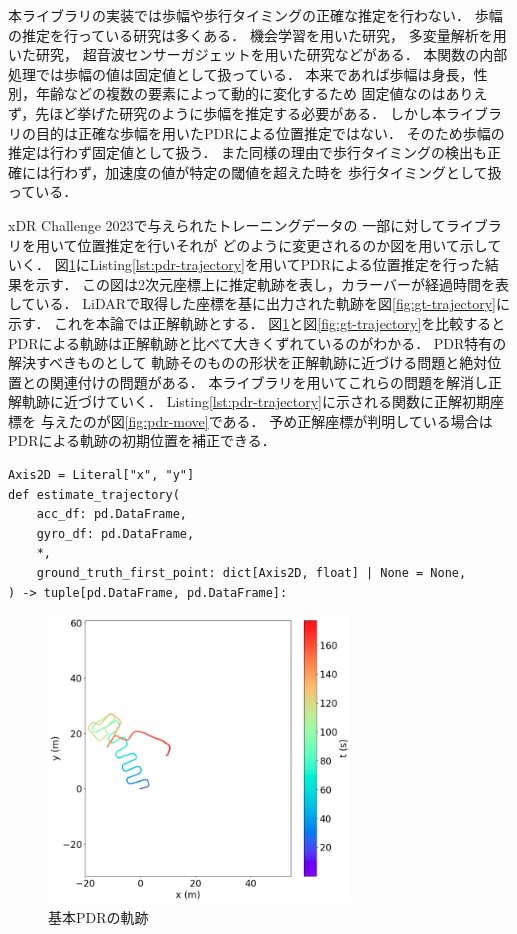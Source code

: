 本ライブラリの実装では歩幅や歩行タイミングの正確な推定を行わない．
歩幅の推定を行っている研究は多くある．
機会学習を用いた研究\cite{stride-length-auto-learning}，
多変量解析を用いた研究\cite{stride-length-multi}，
超音波センサーガジェットを用いた研究\cite{stride-length-ultrasonic}などがある．
本関数の内部処理では歩幅の値は固定値として扱っている．
本来であれば歩幅は身長，性別，年齢などの複数の要素によって動的に変化するため
固定値なのはありえず，先ほど挙げた研究のように歩幅を推定する必要がある．
しかし本ライブラリの目的は正確な歩幅を用いたPDRによる位置推定ではない．
そのため歩幅の推定は行わず固定値として扱う．
また同様の理由で歩行タイミングの検出も正確には行わず，加速度の値が特定の閾値を超えた時を
歩行タイミングとして扱っている．

xDR Challenge 2023で与えられたトレーニングデータの
一部に対してライブラリを用いて位置推定を行いそれが
どのように変更されるのか図を用いて示していく．
図\ref{fig:pdr}にListing\ref{lst:pdr-trajectory}を用いてPDRによる位置推定を行った結果を示す．
この図は2次元座標上に推定軌跡を表し，カラーバーが経過時間を表している．
LiDARで取得した座標を基に出力された軌跡を図\ref{fig:gt-trajectory}に示す．
これを本論では正解軌跡とする．
図\ref{fig:pdr}と図\ref*{fig:gt-trajectory}を比較するとPDRによる軌跡は正解軌跡と比べて大きくずれているのがわかる．
PDR特有の解決すべきものとして
軌跡そのものの形状を正解軌跡に近づける問題と絶対位置との関連付けの問題がある．
本ライブラリを用いてこれらの問題を解消し正解軌跡に近づけていく．
Listing\ref{lst:pdr-trajectory}に示される関数に正解初期座標を
与えたのが図\ref{fig:pdr-move}である．
予め正解座標が判明している場合はPDRによる軌跡の初期位置を補正できる．



\begin{lstlisting}[caption={基本PDR}, label=lst:pdr-trajectory,float =h]
Axis2D = Literal["x", "y"]
def estimate_trajectory(
    acc_df: pd.DataFrame,
    gyro_df: pd.DataFrame,
    *,
    ground_truth_first_point: dict[Axis2D, float] | None = None,
) -> tuple[pd.DataFrame, pd.DataFrame]:
\end{lstlisting}

\begin{figure}[ht]
	\centering
	\includegraphics[width=80mm]{image/pdr.jpg}

	\caption{基本PDRの軌跡}    \label{fig:pdr}
\end{figure}

